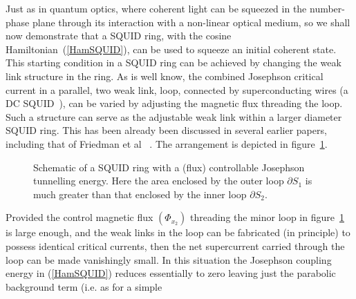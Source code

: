 \documentclass[12pt,a4paper,superscriptaddress,showpacs,floatfix,pra]{revtex4-2}
\begin{document}
Just as in quantum optics, where coherent light can be squeezed in the
number-phase plane  through its interaction with  a non-linear optical
medium, so we shall now demonstrate that a SQUID ring, with the cosine
Hamiltonian~(\ref{HamSQUID}),  can  be  used  to  squeeze  an  initial
coherent  state.  This starting  condition  in  a  SQUID ring  can  be
achieved by changing  the weak link structure in the  ring. As is well
know, the combined Josephson critical  current in a parallel, two weak
link,    loop,   connected    by   superconducting    wires    (a   DC
SQUID~\cite{Likharev86}), can be varied by adjusting the magnetic flux
threading the loop. Such a  structure can serve as the adjustable weak
link within a  larger diameter SQUID ring. This  has been already been
discussed in several earlier papers,  including that of Friedman et al
~\cite{FriedmanPCTL00}.    The     arrangement    is    depicted    in
figure~\ref{fb6}.
\begin{figure}[!t]
\begin{center}
\end{center}
\caption{  Schematic  of  a  SQUID  ring with  a  (flux)  controllable
Josephson tunnelling energy. Here the  area enclosed by the outer loop
$\partial S_{1}$ is much greater  than that enclosed by the inner loop
$\partial S_{2}$. }
\label{fb6}
\end{figure}
Provided  the control  magnetic  flux $\left(  \Phi _{x_{2}}\right)  $
threading the minor loop in  figure~\ref{fb6} is large enough, and the
weak links  in the  loop can be  fabricated (in principle)  to possess
identical critical currents, then the net supercurrent carried through
the  loop  can  be  made  vanishingly small.  In  this  situation  the
Josephson coupling  energy in (\ref{HamSQUID})  reduces essentially to
zero leaving just the parabolic  background term (i.e. as for a simple
\end{document}
